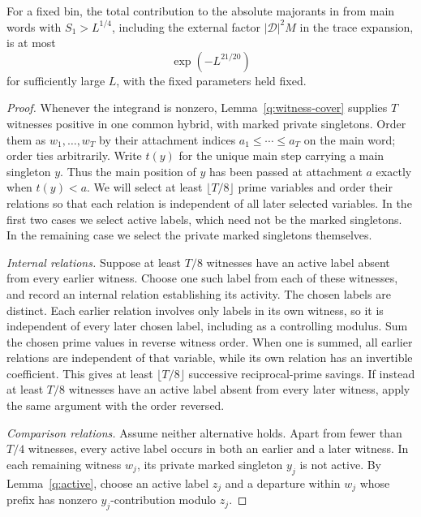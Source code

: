 \begin{lemma}\label{q:singletons}
For a fixed bin, the total contribution to the absolute majorants in
 from main words with $S_1>L^{1/4}$, including
the external factor $|\mathcal D|^2M$ in the trace expansion, is at most
\[
 \exp(-L^{21/20})
\]
for sufficiently large $L$, with the fixed parameters held fixed.
\end{lemma}

\begin{proof}
Whenever the integrand is nonzero, Lemma~\ref{q:witness-cover} supplies
$T$ witnesses positive in one common hybrid, with marked private
singletons.  Order them as $w_1,\ldots,w_T$ by their attachment indices
$a_1\le\cdots\le a_T$ on the main word; order ties arbitrarily.
Write $t(y)$ for the unique main step carrying a main singleton $y$.
Thus the main position of $y$ has been passed at attachment $a$ exactly
when $t(y)<a$.
We will select at least $\lfloor T/8\rfloor$ prime variables and order
their relations so that each relation is independent of all later
selected variables.  In the first two cases we select active labels,
which need not be the marked singletons.  In the remaining case we
select the private marked singletons themselves.

\emph{Internal relations.}
Suppose at least $T/8$ witnesses have an active label absent from every
earlier witness.  Choose one such label from each of these witnesses,
and record an internal relation establishing its activity.  The chosen
labels are distinct.  Each earlier relation involves only labels in its
own witness, so it is independent of every later chosen label, including
as a controlling modulus.  Sum the chosen prime values in reverse
witness order.  When one is summed, all earlier relations are independent
of that variable, while its own relation has an invertible coefficient.
This gives at least $\lfloor T/8\rfloor$ successive reciprocal-prime
savings.  If instead at least $T/8$ witnesses have an active label absent
from every later witness, apply the same argument with the order
reversed.

\emph{Comparison relations.}
Assume neither alternative holds.  Apart from fewer than $T/4$
witnesses, every active label occurs in both an earlier and a later
witness.  In each remaining witness $w_j$, its private marked singleton
$y_j$ is not active.  By Lemma~\ref{q:active}, choose an active label
$z_j$ and a departure within $w_j$ whose prefix has nonzero
$y_j$-contribution modulo $z_j$.


\end{proof}
